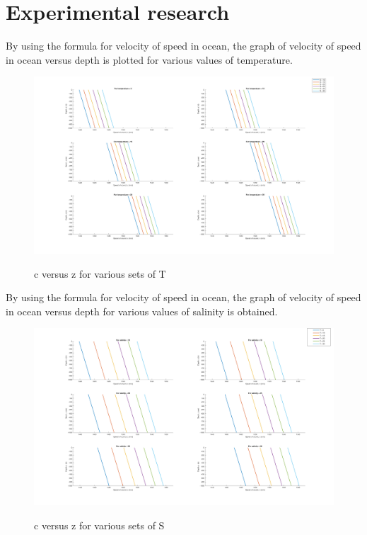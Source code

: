 \chapter{Experimental research} \label{Experimental research}

\noindent By using the formula for velocity of speed in ocean, the graph of velocity of speed in ocean versus depth is plotted for various values of temperature. 

\begin{figure}[H]
\centering
{\includegraphics[scale=0.18]{ucp1.png}}
\caption{c versus z for various sets of T}
\end{figure}

\noindent By using the formula for velocity of speed in ocean, the graph of velocity of speed in ocean versus depth for various values of salinity is obtained. 

\begin{figure}[H]
\centering
{\includegraphics[scale=0.18]{ucp2.png}}
\caption{c versus z for various sets of S}
\end{figure}

